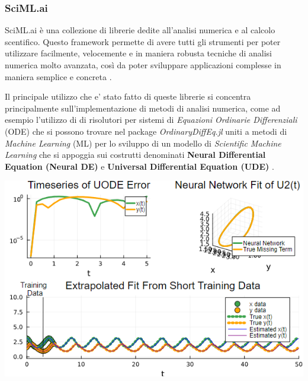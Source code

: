 \subsubsection{SciML.ai}
SciML.ai è una collezione di librerie dedite all'analisi numerica e 
al calcolo scentifico. Questo framework permette di 
avere tutti gli strumenti per poter utilizzare facilmente, 
velocemente e in maniera robusta tecniche di analisi numerica 
molto avanzata, così da poter sviluppare applicazioni complesse 
in maniera semplice e concreta
\cite{rackauckas2017differentialequations} 
\cite{rackauckas2019diffeqflux} 
\cite{rackauckas2020universal}. 

Il principale utilizzo che e' stato fatto di queste librerie si 
concentra principalmente sull'implementazione di metodi di analisi 
numerica, come ad esempio l'utilizzo di di risolutori per sistemi 
di \emph{Equazioni Ordinarie Differenziali} (ODE) che si possono 
trovare nel package \emph{OrdinaryDiffEq.jl} \cite{rackauckas2017differentialequations} 
uniti a metodi di \emph{Machine Learning} (ML) \cite{pal2023lux} \cite{Flux.jl-2018} \cite{innes:2018}
per lo sviluppo di un modello di \emph{Scientific Machine Learning} che si 
appoggia sui costrutti denominati \textbf{Neural Differential Equation (Neural DE)}
e \textbf{Universal Differential Equation (UDE)} 
\cite{rackauckas2019diffeqflux} \cite{rackauckas2020universal}. 

\begin{minipage}{\linewidth}
    \centering
    \includegraphics[width=\textwidth]{img/uode_cont.png}
    \label{fig:SciML_example}
\end{minipage}

